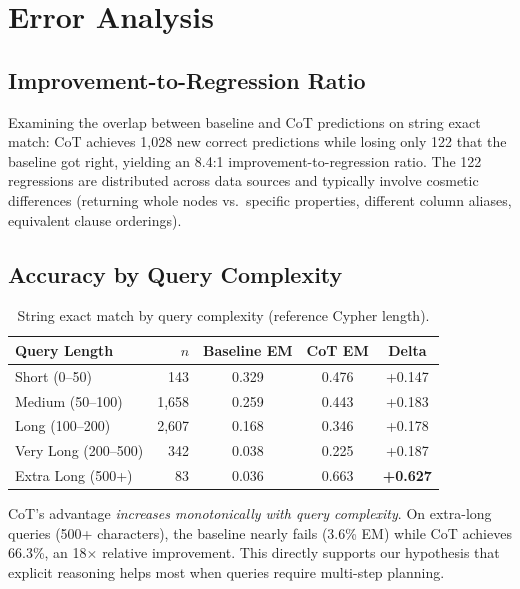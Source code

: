 \documentclass[11pt]{article}
\begin{document}
\section{Error Analysis}

\subsection{Improvement-to-Regression Ratio}

Examining the overlap between baseline and CoT predictions on string exact match: CoT achieves 1,028 new correct predictions while losing only 122 that the baseline got right, yielding an 8.4:1 improvement-to-regression ratio. The 122 regressions are distributed across data sources and typically involve cosmetic differences (returning whole nodes vs.\ specific properties, different column aliases, equivalent clause orderings).

\subsection{Accuracy by Query Complexity}

\begin{table}[h]
\centering
\caption{String exact match by query complexity (reference Cypher length).}
\label{tab:complexity}
\begin{tabular}{lrccc}
\toprule
\textbf{Query Length} & \textbf{$n$} & \textbf{Baseline EM} & \textbf{CoT EM} & \textbf{Delta} \\
\midrule
Short (0--50) & 143 & 0.329 & 0.476 & +0.147 \\
Medium (50--100) & 1,658 & 0.259 & 0.443 & +0.183 \\
Long (100--200) & 2,607 & 0.168 & 0.346 & +0.178 \\
Very Long (200--500) & 342 & 0.038 & 0.225 & +0.187 \\
Extra Long (500+) & 83 & 0.036 & 0.663 & \textbf{+0.627} \\
\bottomrule
\end{tabular}
\end{table}

CoT's advantage \emph{increases monotonically with query complexity}. On extra-long queries (500+ characters), the baseline nearly fails (3.6\% EM) while CoT achieves 66.3\%, an 18$\times$ relative improvement. This directly supports our hypothesis that explicit reasoning helps most when queries require multi-step planning.
\end{document}
